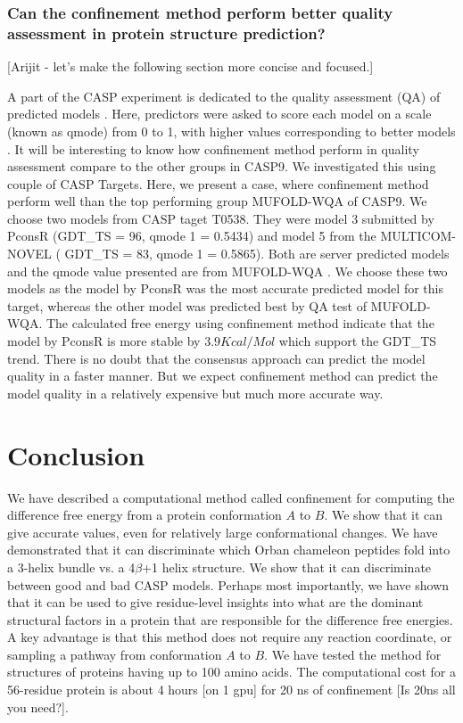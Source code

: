 \documentclass[12pt]{article}
\newcommand{\Ken}[1]{\color{red}#1\normalcolor}
\begin{document}
\subsubsection{Can the confinement method perform better quality assessment in protein structure prediction?}

\Ken{[Arijit - let's make the following section more concise and focused.]}

A part of the CASP experiment is dedicated to the quality assessment (QA) of predicted models
\cite{Kryshtafovych2011}. Here, predictors were asked to score each model on a scale 
(known as qmode) from 0 to 1, with higher values corresponding to better models \cite{Kryshtafovych2011}. 
It will be interesting to know how confinement method perform in quality assessment compare to 
the other groups in CASP9. We investigated this using couple of CASP Targets. Here, we present a 
case, where confinement method perform well than the top performing group MUFOLD-WQA \cite{Wang2011} 
of CASP9. We choose  
two models from CASP taget T0538. They were model 3 submitted by PconsR (GDT\_TS = 96, qmode 1 = 0.5434) 
and model 5 from the MULTICOM-NOVEL ( GDT\_TS = 83, qmode 1 = 0.5865). Both are server predicted models and
the qmode value presented are from MUFOLD-WQA \cite{Wang2011}. We choose these two models as
the model by PconsR was the most accurate predicted model for this target, whereas the other model 
was predicted best by QA test of MUFOLD-WQA. The calculated free energy using confinement method indicate
that the model by PconsR is more stable by $3.9 Kcal/Mol$ which support the GDT\_TS trend.
There is no doubt that the consensus approach can predict the model quality
in a faster manner. But we expect confinement method can predict the model quality in a
relatively expensive but much more accurate way.

\section{Conclusion}

We have described a computational method called confinement for computing the difference free energy from a protein conformation $A$ to $B$.  We 
show that it can give accurate values, even for relatively large conformational changes.  We have demonstrated that it can discriminate 
which Orban chameleon peptides fold into a 3-helix bundle vs. a 4$\beta$+1 helix structure. We show that it can discriminate between good and bad CASP 
models.  Perhaps most importantly, we have shown that it can be used to give residue-level insights into what are the dominant structural factors in a 
protein that are responsible for the difference free energies.  A key advantage is that this method does not require any reaction coordinate, or sampling 
a pathway from conformation $A$ to $B$. We have tested the method for structures of proteins having up to 100 amino acids.  The computational cost 
for a 56-residue protein is about 4 hours [on 1 gpu] for 20 ns of confinement [Is 20ns all you need?]. 
\end{document}
